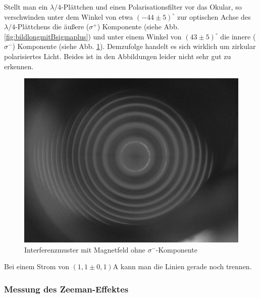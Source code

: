 Stellt man ein $\lambda/4$-Plättchen und einen Polarisationsfilter vor das Okular, so verschwinden unter dem Winkel von etwa $(-44 \pm 5)^\circ$ zur optischen Achse des $\lambda/4$-Plättchens die äußere ($\sigma^+$) Komponente (siehe Abb. \ref{fig:bildlongmitBsigmaplus}) und unter einem Winkel von $(43 \pm 5)^\circ$ die innere ($\sigma^-$) Komponente (siehe Abb. \ref{fig:bildlongmitBsigmaminus}). Demzufolge handelt es sich wirklich um zirkular polarisiertes Licht. Beides ist in den Abbildungen leider nicht sehr gut zu erkennen.\\
\begin{figure}
\centering
\includegraphics[scale=0.1]{data/bilder_okular/bild_8_edit.jpg}
\caption{Interferenzmuster mit Magnetfeld ohne $\sigma^-$-Komponente}
\label{fig:bildlongmitBsigmaminus}
\end{figure}
Bei einem Strom von $\si{(1,1\pm 0,1)\ampere}$ kann man die Linien gerade noch trennen.

\subsubsection{Messung des Zeeman-Effektes}
